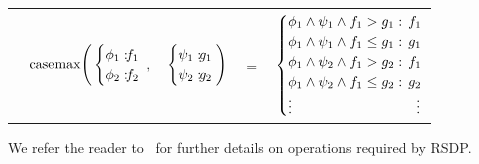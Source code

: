 \documentclass[letterpaper]{article}
\newcommand{\casemax}{\mathrm{casemax}}
\begin{document}
\vspace{-2mm}
{\small
\begin{center}
\begin{tabular}{r c c c l}
&
\hspace{-7mm} $\casemax \Bigg(
  \begin{cases}
    \phi_1: \hspace{-2mm} & \hspace{-2mm} f_1 \\ 
    \phi_2: \hspace{-2mm} & \hspace{-2mm} f_2 \\ 
  \end{cases}$
$,$
&
\hspace{-4mm}
  $\begin{cases}
    \psi_1: \hspace{-2mm} & \hspace{-2mm} g_1 \\ 
    \psi_2: \hspace{-2mm} & \hspace{-2mm} g_2 \\ 
  \end{cases} \Bigg)$
&
\hspace{-4mm} 
$ = $
&
\hspace{-4mm}
  $\begin{cases}
  \phi_1 \wedge \psi_1 \wedge f_1 > g_1    : & \hspace{-2mm} f_1 \\ 
  \phi_1 \wedge \psi_1 \wedge f_1 \leq g_1 : & \hspace{-2mm} g_1 \\ 
  \phi_1 \wedge \psi_2 \wedge f_1 > g_2    : & \hspace{-2mm}f_1 \\ 
  \phi_1 \wedge \psi_2 \wedge f_1 \leq g_2 : & \hspace{-2mm} g_2 \\ 
 \vdots & \vdots
  \end{cases}$
\end{tabular}
\end{center}
}
We refer the reader to~\cite{sdp_aaai,sanner_uai11} for further details
on operations required by RSDP.
\end{document}
